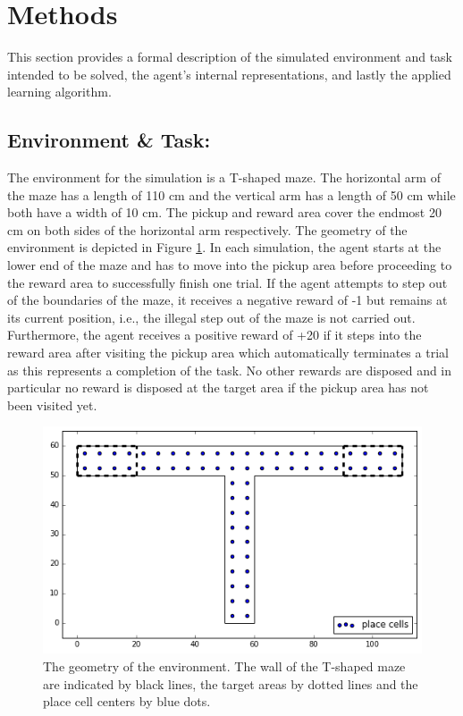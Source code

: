 \section{Methods}
\label{sec:methods}
This section provides a formal description of the simulated environment and task intended to be solved, the agent's internal representations, and lastly the applied learning algorithm. 

\subsection{Environment \& Task:}
The environment for the simulation is a T-shaped maze. The horizontal arm of the maze has a length of 110 cm and the vertical arm has a length of 50 cm while both have a width of 10 cm. The pickup and reward area cover the endmost 20 cm on both sides of the horizontal arm respectively. The geometry of the environment is depicted in Figure \ref{fig:geo}. In each simulation, the agent starts at the lower end of the maze and has to move into the pickup area before proceeding to the reward area to successfully finish one trial. If the agent attempts to step out of the boundaries of the maze, it receives a negative reward of -1 but remains at its current position, i.e., the illegal step out of the maze is not carried out. Furthermore, the agent receives a positive reward of +20 if it steps into the reward area after visiting the pickup area which automatically terminates a trial as this represents a completion of the task. No other rewards are disposed and in particular no reward is disposed at the target area if the pickup area has not been visited yet. 

\begin{figure}[h]
\centering
\includegraphics[width=1\textwidth]{figures/geometry.png}
\caption{\label{fig:geo} The geometry of the environment. The wall of the T-shaped maze are indicated by black lines, the target areas by dotted lines and the place cell centers by blue dots.}
\end{figure}


